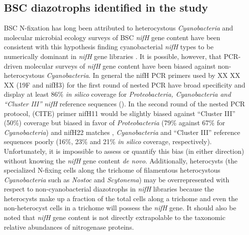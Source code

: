 \subsection{BSC diazotrophs identified in the study} BSC N-fixation has long
been attributed to heterocystous \textit{Cyanobacteria} and molecular microbial
ecology surveys of BSC \textit{nifH} gene content have been consistent with
this hypothesis finding cyanobacterial \textit{nifH} types to be numerically
dominant in \textit{nifH} gene libraries \citep{Yeager,14766579,Yeager_2012}.
It is possible, however, that PCR-driven molecular surveys of \textit{nifH}
gene content have been biased against non-heterocystous \textit{Cyanobacteria}.
In general the nifH PCR primers used by XX XX XX (19F and nifH3) for the first
round of nested PCR have broad specificity and display at least 86\% \textit{in
silico} coverage for \textit{Proteobacteria, Cyanobacteria and ``Cluster III''}
\textit{nifH} reference sequences (\citep{Gaby_2012}). In the second round of
the nested PCR protocol, (CITE) primer nifH11 would be slightly biased against
``Cluster III'' (50\%) coverage but biased in favor of \textit{Proteobacteria}
(79\% against 67\% for \textit{Cyanobacteria}) and nifH22 matches
, \textit{Cyanobacteria} and ``Cluster III'' reference
sequences poorly (16\%, 23\% and 21\% \textit{in silico} coverage,
respectively).  Unfortunately, it is impossible to assess or quantify this bias
(in either direction) without knowing the \textit{nifH} gene content \textit{de
novo}. Additionally, heterocysts (the specialized N-fixing cells along the
trichome of filamentous heterocystous \textit{Cyanobacteria} such as
\textit{Nostoc} and \textit{Scytonema}) may be overrepresented with respect to
non-cyanobacterial diazotrophs in \textit{nifH} libraries because the
heterocysts make up a fraction of the total cells along a trichome and even the
non-heterocyst cells in a trichome will possess the \textit{nifH} gene. It
should also be noted that \textit{nifH} gene content is not directly
extrapolable to the taxonomic relative abundances of nitrogenase proteins.

